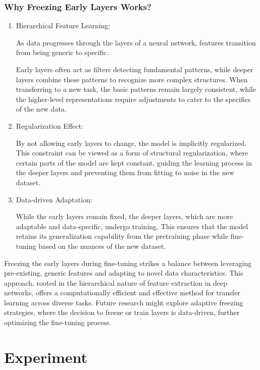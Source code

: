 \documentclass{article}
\begin{document}
\subsubsection{Why Freezing Early Layers Works?}
\begin{enumerate}
  \item Hierarchical Feature Learning: 
  
  As data progresses through the layers of a neural network, features transition from being generic to specific. 

Early layers often act as filters detecting fundamental patterns, while deeper layers combine these patterns to recognize more complex structures. 
When transferring to a new task, the basic patterns remain largely consistent, while the higher-level representations require adjustments to cater to the specifics of the new data.

\item Regularization Effect: 

By not allowing early layers to change, the model is implicitly regularized. This constraint can be viewed as a form of structural regularization, where certain parts of the model are kept constant, guiding the learning process in the deeper layers and preventing them from fitting to noise in the new dataset.

\item Data-driven Adaptation: 

While the early layers remain fixed, the deeper layers, which are more adaptable and data-specific, undergo training. This ensures that the model retains its generalization capability from the pretraining phase while fine-tuning based on the nuances of the new dataset.
\end{enumerate}

Freezing the early layers during fine-tuning strikes a balance between leveraging pre-existing, generic features and adapting to novel data characteristics. This approach, rooted in the hierarchical nature of feature extraction in deep networks, offers a computationally efficient and effective method for transfer learning across diverse tasks. Future research might explore adaptive freezing strategies, where the decision to freeze or train layers is data-driven, further optimizing the fine-tuning process.
  
\section{Experiment}
\end{document}
